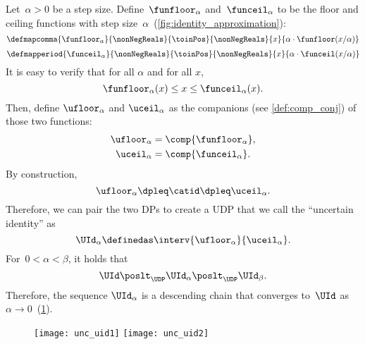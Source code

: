 Let~$\alpha>0$ be a step size.
Define~$\funfloor_{\alpha}$ and~$\funceil_{\alpha}$ to be the floor and ceiling functions with step size~$\alpha$~(\cref{fig:identity_approximation}):
\begin{equation}
    \defmapcomma{
        \funfloor_{\alpha}
    }{
        \nonNegReals
    }{
        \toinPos
    }{
        \nonNegReals
    }{
        x
    }{
        \alpha \cdot \funfloor(x/\alpha)
    }
\end{equation}
\begin{equation}
    \defmapperiod{
        \funceil_{\alpha}
    }{
        \nonNegReals
    }{
        \toinPos
    }{
        \nonNegReals
    }{
        x
    }{
        \alpha \cdot \funceil(x/\alpha)
    }
\end{equation}
It is easy to verify that for all $\alpha$ and for all $x$,
\begin{equation}
    \funfloor_{\alpha}(x) \leq x \leq \funceil_{\alpha}(x).
\end{equation}
Then, define $\ufloor_{\alpha}$ and $\uceil_\alpha$ as the companions (see \cref{def:comp_conj}) of those two functions:
\begin{align}
    \ufloor_{\alpha} & = \comp{\funfloor_\alpha}, \\
    \uceil_{\alpha}  & = \comp{\funceil_\alpha} .
\end{align}
By construction,
\begin{equation}
    \ufloor_{\alpha}\dpleq\catid\dpleq\uceil_{\alpha}.
\end{equation}
Therefore, we can pair the two DPs to create a UDP that we call the ``uncertain identity'' as
\begin{equation}
    \UId_{\alpha}\definedas \interv {\ufloor_{\alpha}} {\uceil_{\alpha}}.
\end{equation}
For~$0<\alpha<\beta$, it holds that
%
\begin{equation}
    \UId\poslt_{\UDP}\UId_{\alpha}\poslt_{\UDP}\UId_{\beta}.
\end{equation}
%
Therefore, the sequence $\UId_{\alpha}$ is a descending chain that converges to~$\UId$ as~$\alpha\to0$~(\cref{fig:other}).

\begin{figure}[b]
    \hfill
    \texttt{[image: unc\_uid1]}
    \hfill
    \texttt{[image: unc\_uid2]}
    \hfill
    \caption{}
    \label{fig:other}
\end{figure}

\vfill\pagebreak
